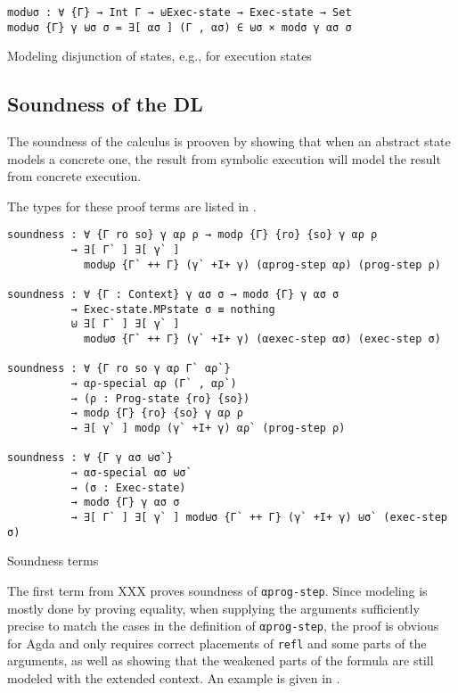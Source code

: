 \begin{listing}[!ht]
\begin{verbatim}
mod⊎σ : ∀ {Γ} → Int Γ → ⊎Exec-state → Exec-state → Set
mod⊎σ {Γ} γ ⊎σ σ = ∃[ ασ ] (Γ , ασ) ∈ ⊎σ × modσ γ ασ σ
\end{verbatim}
\caption{Modeling disjunction of states, e.g., for execution states}
\label{modUsigma}
\end{listing}


\subsection{Soundness of the DL}\label{soundness}

The soundness of the calculus is prooven by showing that
when an abstract state models a concrete one,
the result from symbolic execution will model the result from concrete execution.

The types for these proof terms are listed in .

\begin{listing}[!ht]
\begin{verbatim}
soundness : ∀ {Γ ro so} γ αρ ρ → modρ {Γ} {ro} {so} γ αρ ρ
          → ∃[ Γ` ] ∃[ γ` ]
            mod⊎ρ {Γ` ++ Γ} (γ` +I+ γ) (αprog-step αρ) (prog-step ρ)

soundness : ∀ {Γ : Context} γ ασ σ → modσ {Γ} γ ασ σ
          → Exec-state.MPstate σ ≡ nothing
          ⊎ ∃[ Γ` ] ∃[ γ` ]
            mod⊎σ {Γ` ++ Γ} (γ` +I+ γ) (αexec-step ασ) (exec-step σ)

soundness : ∀ {Γ ro so γ αρ Γ` αρ`}
          → αρ-special αρ (Γ` , αρ`)
          → (ρ : Prog-state {ro} {so})
          → modρ {Γ} {ro} {so} γ αρ ρ
          → ∃[ γ` ] modρ (γ` +I+ γ) αρ` (prog-step ρ)

soundness : ∀ {Γ γ ασ ⊎σ`}
          → ασ-special ασ ⊎σ`
          → (σ : Exec-state)
          → modσ {Γ} γ ασ σ
          → ∃[ Γ` ] ∃[ γ` ] mod⊎σ {Γ` ++ Γ} (γ` +I+ γ) ⊎σ` (exec-step σ)
\end{verbatim}
\caption{Soundness terms}
\label{soundness}
\end{listing}

The first term from XXX proves soundness of \verb/αprog-step/.
Since modeling is mostly done by proving equality,
when supplying the arguments sufficiently precise to match the cases in the definition
of \verb/αprog-step/, the proof is obvious for Agda and only requires
correct placements of \verb/refl/ and some parts of the arguments,
as well as showing that the weakened parts of the formula
are still modeled with the extended context.
An example is given in .

